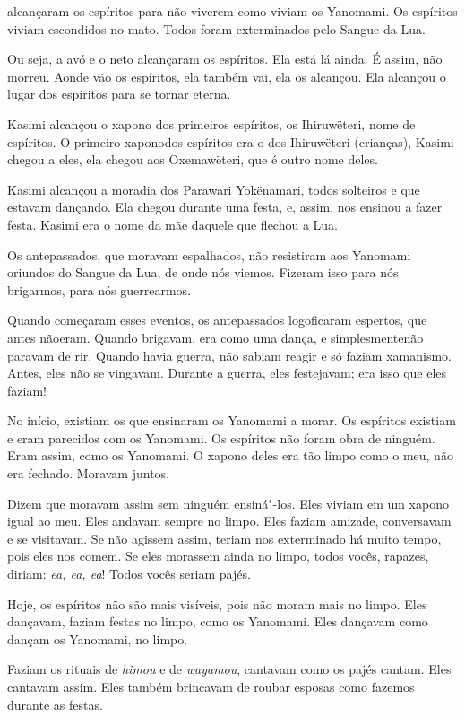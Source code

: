  

 alcançaram os espíritos para não viverem como viviam
os {Yanomami}. Os espíritos viviam escondidos no mato. Todos foram
exterminados pelo Sangue da Lua.

Ou seja, a avó e o neto alcançaram os espíritos. Ela está lá ainda. É assim, não morreu. Aonde vão os espíritos, ela também vai, ela os
alcançou. Ela alcançou o lugar dos espíritos para se tornar eterna. 

Kasimi alcançou o xapono dos primeiros espíritos, os Ihiruwëteri, nome
de espíritos. O primeiro xaponodos espíritos era o dos
Ihiruwëteri (crianças), Kasimi chegou a eles, ela chegou aos
Oxemawëteri, que é outro nome deles. 

Kasimi alcançou a moradia dos Parawari Yokënamari, todos solteiros e que
estavam dançando. Ela chegou durante uma festa, e, assim, nos ensinou a
fazer festa. Kasimi era o nome da mãe daquele que flechou a Lua.

Os antepassados, que moravam espalhados, não resistiram aos Yanomami
oriundos do Sangue da Lua, de onde nós viemos. Fizeram isso para nós
brigarmos, para nós guerrearmos. 

Quando começaram esses eventos, os antepassados logoficaram espertos,
que antes nãoeram. Quando brigavam, era como uma dança, e
simplesmentenão paravam de rir. Quando havia guerra, não sabiam reagir
e {só} faziam {xamanismo}. Antes, eles não se vingavam.
Durante a guerra, eles festejavam; era isso que eles faziam! 

No início, existiam os que ensinaram os Yanomami a morar. Os espíritos
existiam e eram parecidos com os Yanomami. Os espíritos não foram obra
de ninguém. Eram assim, como os Yanomami. O xapono deles era tão limpo
como o meu, não era fechado. Moravam juntos. 

Dizem que moravam assim sem ninguém ensiná"-los. Eles viviam em um xapono
igual ao meu. Eles andavam sempre no limpo. Eles faziam amizade,
conversavam e se visitavam. Se não agissem assim, teriam nos exterminado
há muito tempo, pois eles nos comem. Se eles morassem ainda no limpo,
todos vocês, rapazes, diriam: \emph{ea, ea, ea}! Todos vocês seriam
pajés. 

Hoje, os espíritos não são mais visíveis, pois não moram mais no limpo.
Eles dançavam, faziam festas no limpo, como os Yanomami. Eles dançavam
como dançam os Yanomami, no limpo. 

Faziam os rituais de \emph{himou} e de \emph{wayamou}, cantavam como os
pajés cantam. Eles cantavam assim. Eles também brincavam de roubar
esposas como fazemos durante as festas. 

